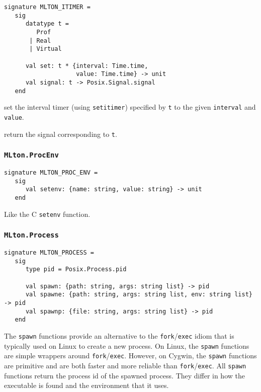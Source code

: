 \begin{verbatim}
signature MLTON_ITIMER =
   sig
      datatype t =
         Prof
       | Real
       | Virtual

      val set: t * {interval: Time.time,
                    value: Time.time} -> unit
      val signal: t -> Posix.Signal.signal
   end
\end{verbatim}

\begin{description}
set the interval timer (using {\tt setitimer}) specified by {\tt t} to the given
{\tt interval} and {\tt value}.

return the signal corresponding to {\tt t}.
\end{description}

\subsubsection{\tt MLton.ProcEnv}
\begin{verbatim}
signature MLTON_PROC_ENV =
   sig
      val setenv: {name: string, value: string} -> unit
   end
\end{verbatim}

\begin{description}
Like the C {\tt setenv} function.
\end{description}

\subsubsection{\tt MLton.Process}

\begin{verbatim}
signature MLTON_PROCESS =
   sig
      type pid = Posix.Process.pid

      val spawn: {path: string, args: string list} -> pid
      val spawne: {path: string, args: string list, env: string list} -> pid
      val spawnp: {file: string, args: string list} -> pid
   end
\end{verbatim}

The {\tt spawn} functions provide an alternative to the {\tt fork}/{\tt exec}
idiom that is typically used on Linux to create a new process.  On Linux, the
{\tt spawn} functions are simple wrappers around {\tt fork}/{\tt exec}.
However, on Cygwin, the {\tt spawn} functions are primitive and are both faster
and more reliable than {\tt fork}/{\tt exec}.  All {\tt spawn} functions return
the process id of the spawned process.  They differ in how the executable is
found and the environment that it uses.

